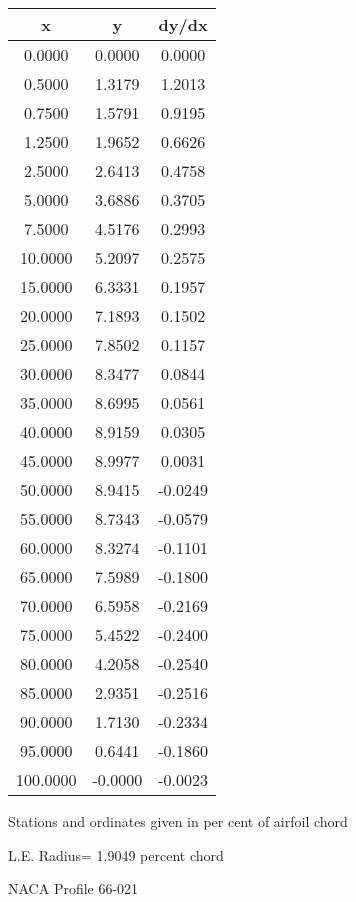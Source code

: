 \documentclass[11pt]{book}
\begin{document}
 \vspace{8mm}
 \begin{tabular}{|c|c|c|} \hline 
  x  &  y  &  dy/dx \\
 \hline
0.0000 & 0.0000 & 0.0000 \\
0.5000 & 1.3179 & 1.2013 \\
0.7500 & 1.5791 & 0.9195 \\
1.2500 & 1.9652 & 0.6626 \\
2.5000 & 2.6413 & 0.4758 \\
5.0000 & 3.6886 & 0.3705 \\
7.5000 & 4.5176 & 0.2993 \\
10.0000 & 5.2097 & 0.2575 \\
15.0000 & 6.3331 & 0.1957 \\
20.0000 & 7.1893 & 0.1502 \\
25.0000 & 7.8502 & 0.1157 \\
30.0000 & 8.3477 & 0.0844 \\
35.0000 & 8.6995 & 0.0561 \\
40.0000 & 8.9159 & 0.0305 \\
45.0000 & 8.9977 & 0.0031 \\
50.0000 & 8.9415 & -0.0249 \\
55.0000 & 8.7343 & -0.0579 \\
60.0000 & 8.3274 & -0.1101 \\
65.0000 & 7.5989 & -0.1800 \\
70.0000 & 6.5958 & -0.2169 \\
75.0000 & 5.4522 & -0.2400 \\
80.0000 & 4.2058 & -0.2540 \\
85.0000 & 2.9351 & -0.2516 \\
90.0000 & 1.7130 & -0.2334 \\
95.0000 & 0.6441 & -0.1860 \\
100.0000 & -0.0000 & -0.0023 \\
 \hline
 \end{tabular}
 \vspace{8mm}


Stations and ordinates given in per cent of airfoil chord 


L.E. Radius=  1.9049 percent chord
 \newpage
  \label{p66-021}
 \begin{Large}
 NACA Profile 66-021
 \end{Large}
  
\end{document}
